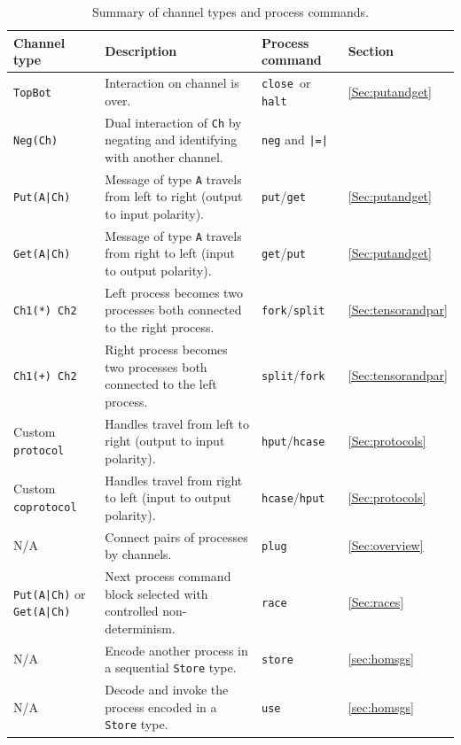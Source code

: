 \documentclass[11pt]{article}
\begin{document}
\begin{table}[h]
\begin{center}
	\quad \begin{tabular}{ |m{3.5cm} | m{7cm} | m{2cm} | m{1.2cm} | }
	\hline
		 Channel type & Description & Process command & Section \\
		 \hline
		 \hline      
		 \lstinline$TopBot$ & Interaction on channel is over.  & \lstinline$close $or \lstinline$halt$ & \ref{Sec:putandget} \\
		 \hline      
		 \lstinline$Neg(Ch)$ & Dual interaction of \lstinline$Ch$ by negating and identifying with another channel.  & \lstinline$neg$ and \lstinline$|=|$  &  \\
		 \hline      
		 \lstinline$Put(A|Ch)$ & Message of type \lstinline$A$ travels from left to right (output to input polarity).  & \lstinline$put$/\lstinline$get$ & \ref{Sec:putandget} \\
		 \hline      
		 \lstinline$Get(A|Ch)$ & Message of type \lstinline$A$ travels from right to left (input to output polarity). & \lstinline$get$/\lstinline$put$ & \ref{Sec:putandget} \\
		 \hline      
		 \lstinline$Ch1(*) Ch2$ & Left process becomes two processes both connected to the right process.  & \lstinline$fork$/\lstinline$split$ & \ref{Sec:tensorandpar} \\
		 \hline
		 \lstinline$Ch1(+) Ch2$ & Right process becomes two processes both connected to the left process.  & \lstinline$split$/\lstinline$fork$ & \ref{Sec:tensorandpar} \\
		 \hline
		 Custom \lstinline$protocol$ & Handles travel from left to right (output to input polarity). & \lstinline$hput$/\lstinline$hcase$ & \ref{Sec:protocols} \\
		 \hline
		 Custom \lstinline$coprotocol$ & Handles travel from right to left (input to output polarity). & \lstinline$hcase$/\lstinline$hput$ & \ref{Sec:protocols} \\
		 \hline
		  N/A & Connect pairs of processes by channels.  & \lstinline$plug$ & \ref{Sec:overview} \\
		 \hline
		  \lstinline$Put(A|Ch)$ or \newline \lstinline$Get(A|Ch)$ & Next process command block selected with controlled non-determinism.  & \lstinline$race$ & \ref{Sec:races} \\
		 \hline
		  N/A & Encode another process in a sequential \lstinline$Store$ type. & \lstinline$store$ &  \ref{sec:homsgs}\\
		 \hline
		  N/A & Decode and invoke the process encoded in a \lstinline$Store$ type. & \lstinline$use$ & \ref{sec:homsgs} \\
		 \hline
	\end{tabular}
	\caption{Summary of channel types and process commands.}
	\label{Table:summary}
\end{center}
\end{table}
\end{document}
